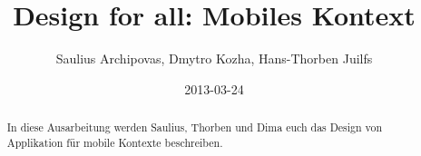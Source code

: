 \documentclass[]{article}
\title{Design for all: Mobiles Kontext}
\author{Saulius Archipovas, Dmytro Kozha, Hans-Thorben Juilfs}
\date{2013-03-24}
\begin{document}
\ifpdf
{}
\else
{}
\fi

\clearpage
\maketitle
\newpage
{}
\tableofcontents %

\clearpage
{}
\newpage



\begin{abstract}
	In diese Ausarbeitung werden Saulius, Thorben und Dima euch das Design von Applikation für mobile Kontexte beschreiben.
\end{abstract}


\newpage

\newpage

\newpage
\newpage
\printbibliography
\end{document}
